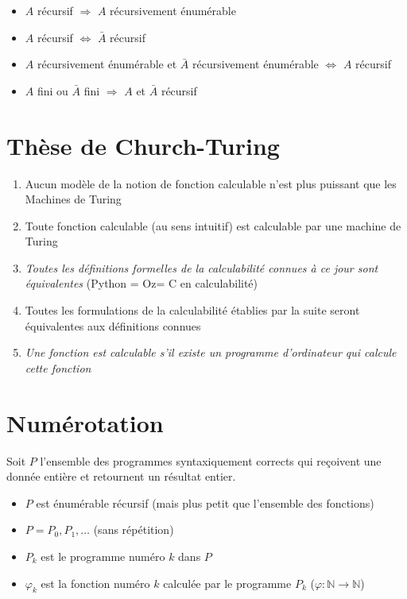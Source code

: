 \begin{itemize}
\item $A$ récursif $\Rightarrow$ $A$ récursivement énumérable
\item $A$ récursif $\Leftrightarrow$ $\bar{A}$ récursif
\item $A$ récursivement énumérable et $\bar{A}$ récursivement énumérable $\Leftrightarrow$ $A$ récursif
\item $A$ fini ou $\bar{A}$ fini $\Rightarrow$ $A$ et $\bar{A}$ récursif
\end{itemize}

\section{Thèse de Church-Turing}

\begin{enumerate}
\item Aucun modèle de la notion de fonction calculable n'est plus puissant que les Machines de Turing
\item Toute fonction calculable (au sens intuitif) est calculable par une machine de Turing
\item \textit{Toutes les définitions formelles de la calculabilité connues à ce jour sont équivalentes} (Python = Oz= C en calculabilité)
\item Toutes les formulations de la calculabilité établies par la suite seront équivalentes aux définitions connues
\item \textit{Une fonction est calculable s'il existe un programme d'ordinateur qui calcule cette fonction}
\end{enumerate}

\section{Numérotation}

Soit $P$ l'ensemble des programmes syntaxiquement corrects qui reçoivent une donnée entière et retournent un résultat entier.
\begin{itemize}
\item $P$ est énumérable récursif (mais plus petit que l'ensemble des fonctions)
\item $P = P_0, P_1, \ldots$ (sans répétition)
\item $P_k$ est le programme numéro $k$ dans $P$
\item $\varphi_k$ est la fonction numéro $k$ calculée par le programme $P_k$ ($\varphi : \mathbb{N} \rightarrow \mathbb{N}$)
\end{itemize}

